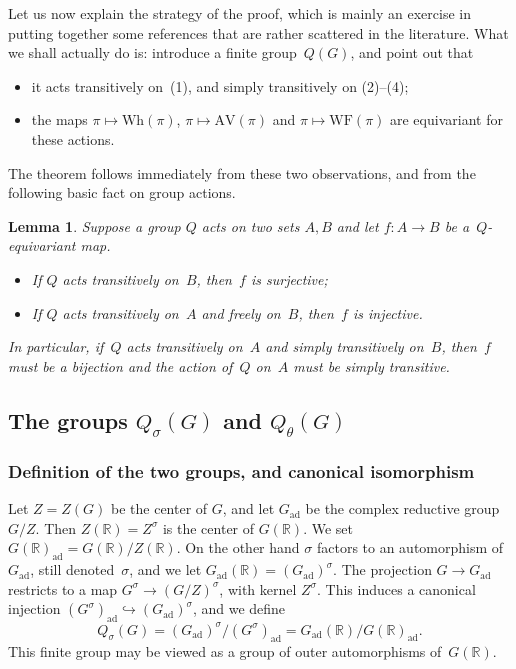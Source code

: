 \documentclass[10pt,leqno]{article}
\newtheorem{lemma}[equation]{Lemma}
\numberwithin{equation}{section}
\newcommand{\ad}{\mathrm{ad}}
\newcommand{\Gad}{G_\mathrm{ad}}
\newcommand{\R}{\mathbb R}
\newcommand{\G}{G}
\newcommand{\AV}{\mathrm{AV}}
\newcommand{\Wh}{\mathrm{Wh}}
\newcommand{\WF}{\mathrm{WF}}
\begin{document}
Let us now explain the strategy of the proof, which is mainly an exercise in putting together some references that are rather scattered in the literature. What we shall actually do is: introduce a finite group~$Q(G)$, and point out that 
\begin{itemize}
\item[(i)] it acts transitively on~(1), and simply transitively on (2)--(4);
\item[(ii)] the maps $\pi \mapsto \Wh(\pi)$, $\pi \mapsto \AV(\pi)$ and $\pi\mapsto \WF(\pi)$  are equivariant for these actions.
\end{itemize}
The theorem follows immediately from these two observations, and from the following basic fact on group actions.

\begin{lemma} Suppose a group $Q$ acts on two sets $A, B$ and let $f\colon A \to B$ be a~$Q$-equivariant map. 
\begin{itemize}
\item[(a)] If $Q$ acts transitively on~$B$,  then~$f$ is surjective\textup{;}
\item[(b)] If $Q$ acts transitively on~$A$ and freely on~$B$, then~$f$ is injective.
\end{itemize}
In particular, if~$Q$ acts transitively on~$A$ and simply transitively on~$B$, then~$f$ must be a bijection and the action of~$Q$ on~$A$ must be simply transitive.
\end{lemma}

\subsection{The groups $Q_\sigma(G)$ and $Q_{\theta}(G)$}

\subsubsection{Definition of the two groups, and canonical isomorphism}

Let $Z=Z(G)$ be the center of $G$, and let $\Gad$ be the complex reductive group~$G/Z$.
Then $Z(\R)=Z^\sigma$ is the center of $G(\R)$. We set $\G(\R)_\ad=G(\R)/Z(\R)$.
On the other hand  $\sigma$ factors to an automorphism  of $\Gad$, still denoted~$\sigma$, and we let  $\Gad(\R)=(\Gad)^\sigma$.
The projection $G\rightarrow \Gad$ restricts to a map $G^\sigma\rightarrow (G/Z)^\sigma$, with kernel $Z^\sigma$.
This induces a canonical injection $(G^\sigma)_\ad\hookrightarrow (\Gad)^\sigma$, and we define
$$
Q_\sigma(G)=(\Gad)^\sigma/(G^\sigma)_\ad=\Gad(\R)/\G(\R)_\ad.
$$
This finite group may be viewed as a group of outer automorphisms of~$G(\R)$.
\end{document}
